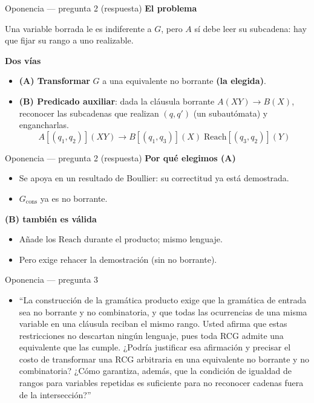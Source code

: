 \documentclass{beamer}
\newcommand{\azul}[1]{\textbf{\textcolor{blue!70!black}{#1}}}
\begin{document}
\begin{frame}{Oponencia --- pregunta 2 (respuesta)}
  \textbf{El problema}

  Una variable borrada le es indiferente a $G$, pero $A$ sí debe leer su subcadena: hay que fijar su rango a uno realizable.

  \pause
  \vspace{0.3cm}

  \textbf{Dos vías}
  \begin{itemize}
    \item \textbf{(A) Transformar} $G$ a una equivalente no borrante \azul{(la elegida)}.
    \item \pause \textbf{(B) Predicado auxiliar}: dada la cláusula borrante $A(XY)\to B(X)$, reconocer las subcadenas que realizan $(q,q')$ (un subautómata) y engancharlas.
      \[ A[(q_1,q_2)](XY) \to B[(q_1,q_3)](X)\; \mathrm{Reach}[(q_3,q_2)](Y) \]
  \end{itemize}
\end{frame}

\begin{frame}{Oponencia --- pregunta 2 (respuesta)}
  \textbf{Por qué elegimos (A)}
  \begin{itemize}
    \item Se apoya en un resultado de Boullier: su correctitud ya está demostrada.
    \item $G_{\mathrm{cons}}$ ya es no borrante.
  \end{itemize}

  \pause
  \vspace{0.2cm}

  \textbf{(B) también es válida}
  \begin{itemize}
    \item Añade los $\mathrm{Reach}$ durante el producto; mismo lenguaje.
    \item Pero exige rehacer la demostración (sin no borrante).
  \end{itemize}
\end{frame}

\begin{frame}{Oponencia --- pregunta 3}
  \small
  \begin{itemize}
    \item ``La construcción de la gramática producto exige que la gramática de entrada sea no borrante y no combinatoria, y que todas las ocurrencias de una misma variable en una cláusula reciban el mismo rango. Usted afirma que estas restricciones no descartan ningún lenguaje, pues toda RCG admite una equivalente que las cumple. ¿Podría justificar esa afirmación y precisar el costo de transformar una RCG arbitraria en una equivalente no borrante y no combinatoria? ¿Cómo garantiza, además, que la condición de igualdad de rangos para variables repetidas es suficiente para no reconocer cadenas fuera de la intersección?''
  \end{itemize}
\end{frame}
\end{document}
